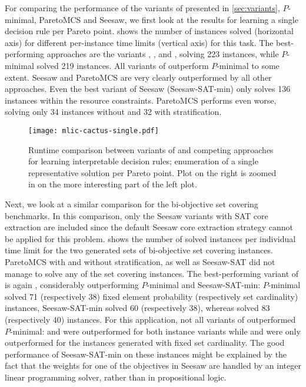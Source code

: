 For comparing the performance of the variants of \algname{} presented in \cref{sec:variants}, $P$-minimal, ParetoMCS and Seesaw, we first look at the results for learning a single decision rule per Pareto point.
 shows the number of instances solved (horizontal axis) for different per-instance time limits (vertical axis) for this task.
The best-performing approaches are the \algname{} variants \msh{}, \satunsat{}, \unsatsat{} and \msu{}, solving 223 instances, while $P$-minimal solved 219 instances.
All variants of \algname{} outperform $P$-minimal to some extent.
Seesaw and ParetoMCS are very clearly outperformed by all other approaches.
Even the best variant of Seesaw (Seesaw-SAT-min) only solves 136 instances within the resource constraints.
ParetoMCS performs even worse, solving only 34 instances without and 32 with stratification.

\begin{figure}
    \centering
    \texttt{[image: mlic-cactus-single.pdf]}
    \caption{Runtime comparison between variants of \algname{} and competing approaches for learning interpretable decision rules;
      enumeration of a single representative solution per Pareto point.
      Plot on the right is zoomed in on the more interesting part of the left plot.
    }\label{fig:mlic-cactus-single}
\end{figure}

Next, we look at a similar comparison for the bi-objective set covering benchmarks.
In this comparison, only the Seesaw variants with SAT core extraction are included since the default Seesaw core extraction strategy cannot be applied for this problem.
 shows the number of solved instances per individual time limit for the two generated sets of bi-objective set covering instances.
ParetoMCS with and without stratification, as well as Seesaw-SAT did not manage to solve any of the set covering instances.
The best-performing variant of \algname{} is again \msh{}, considerably outperforming $P$-minimal and Seesaw-SAT-min:
$P$-minimal solved 71 (respectively 38) fixed element probability (respectively set cardinality) instances, Seesaw-SAT-min solved 60 (respectively 38), whereas \msh{} solved 83 (respectively 40) instances.
For this application, not all variants of \algname{} outperformed $P$-minimal:
\msu{} and \oll{} were outperformed for both instance variants while \satunsat{} and \unsatsat{} were only outperformed for the instances generated with fixed set cardinality.
The good performance of Seesaw-SAT-min on these instances might be explained by the fact that the weights for one of the objectives in Seesaw are handled by an integer linear programming solver, rather than in propositional logic.

